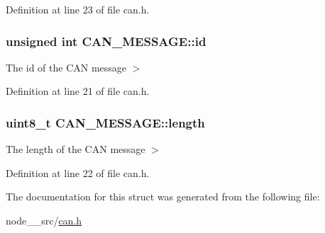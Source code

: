 Definition at line 23 of file can.\+h.

\subsubsection[{\texorpdfstring{id}{id}}]{\setlength{\rightskip}{0pt plus 5cm}unsigned int C\+A\+N\+\_\+\+M\+E\+S\+S\+A\+G\+E\+::id}\hypertarget{structCAN__MESSAGE_a5dcbfe2aa7e36c8f3f4f036487ae07ff}{}\label{structCAN__MESSAGE_a5dcbfe2aa7e36c8f3f4f036487ae07ff}
The id of the C\+AN message $>$ 

Definition at line 21 of file can.\+h.

\subsubsection[{\texorpdfstring{length}{length}}]{\setlength{\rightskip}{0pt plus 5cm}uint8\+\_\+t C\+A\+N\+\_\+\+M\+E\+S\+S\+A\+G\+E\+::length}\hypertarget{structCAN__MESSAGE_a9f29743aada8d97998cc349d351c0e07}{}\label{structCAN__MESSAGE_a9f29743aada8d97998cc349d351c0e07}
The length of the C\+AN message $>$ 

Definition at line 22 of file can.\+h.



The documentation for this struct was generated from the following file\+:\begin{DoxyCompactItemize}
\item 
node\+\_\+\_\+src/\hyperlink{can_8h}{can.\+h}\end{DoxyCompactItemize}
